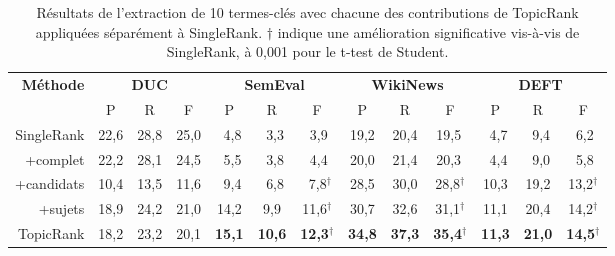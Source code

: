     \begin{table}
      \centering
      \begin{tabular}{@{~}r@{~~}c@{~~}c@{~~}c@{~~}c@{~~}c@{~~}c@{~~}c@{~~}c@{~~}c@{~~}c@{~~}c@{~~}c@{~}}
        \toprule
        \multirow{2}{*}[-2pt]{\textbf{Méthode}} & \multicolumn{3}{c}{\textbf{DUC}} & \multicolumn{3}{c}{\textbf{SemEval}} & \multicolumn{3}{c}{\textbf{WikiNews}} & \multicolumn{3}{c}{\textbf{DEFT}}\\
        \cmidrule(r){2-4}\cmidrule(r){5-7}\cmidrule(r){8-10}\cmidrule{11-13}
        & P & R & F & P & R & F & P & R & F & P & R & F\\
        \midrule
        SingleRank & 22,6 & 28,8 & 25,0 & $~~$4,8 & $~~$3,3 & $~~$3,9$^{~}$ & 19,2 & 20,4 & 19,5$^{~}$ & $~~$4,7 & $~~$9,4 & $~~$6,2$^{~}$\\
        +complet & 22,2 & 28,1 & 24,5 & $~~$5,5 & $~~$3,8 & $~~$4,4$^{~}$ & 20,0 & 21,4 & 20,3${~}$ & $~~$4,4 & $~~$9,0 & $~~$5,8$^{~}$\\
        +candidats & 10,4 & 13,5 & 11,6 & $~~$9,4 & $~~$6,8 & $~~$7,8$^\dagger$ & 28,5 & 30,0 & 28,8$^\dagger$ & 10,3 & 19,2 & 13,2$^\dagger$\\
        +sujets & 18,9 & 24,2 & 21,0 & 14,2 & 9,9 & 11,6$^\dagger$ & 30,7 & 32,6 & 31,1$^\dagger$ & 11,1 & 20,4 & 14,2$^\dagger$\\
        TopicRank & 18,2 & 23,2 & 20,1 & \textbf{15,1} & \textbf{10,6} & \textbf{12,3}$^\dagger$ & \textbf{34,8} & \textbf{37,3} & \textbf{35,4}$^\dagger$ & \textbf{11,3} & \textbf{21,0} & \textbf{14,5}$^\dagger$\\
        \bottomrule
      \end{tabular}
      \caption{Résultats de l'extraction de 10 termes-clés avec chacune des
               contributions de TopicRank appliquées séparément à SingleRank.
               $\dagger$ indique une amélioration significative vis-à-vis de
               SingleRank, à 0,001 pour le t-test de Student.
               \label{tab:evaluation_individuelle_des_ameliorations}}
    \end{table}

